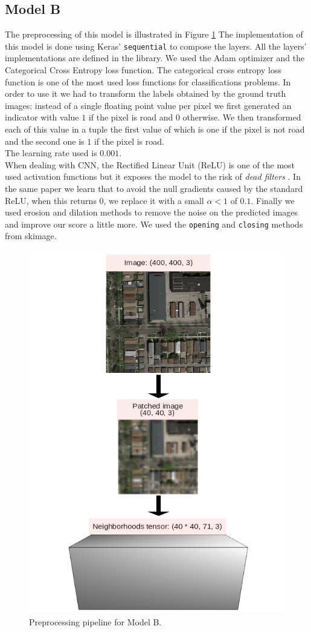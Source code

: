 \documentclass[10pt,conference,compsocconf]{IEEEtran}
\begin{document}
\subsection{Model B}
The preprocessing of this model is illustrated in Figure \ref{fig:cnn-preproc}
The implementation of this model is done using Keras' \texttt{sequential} to compose the layers. All the layers' implementations are defined in the library. We used the Adam optimizer and the Categorical Cross Entropy loss function.
The categorical cross entropy loss function is one of the most used loss functions for classifications problems. In order to use it we had to transform the labels obtained by the ground truth images: instead of a single floating point value per pixel we first generated an indicator with value $1$ if the pixel is road and $0$ otherwise.
We then transformed each of this value in a tuple the first value of which is one if the pixel is not road and the second one is $1$ if the pixel is road.\\
The learning rate used is $0.001$.\\
When dealing with CNN, the Rectified Linear Unit (ReLU) is one of the most used activation functions but it exposes the model to the risk of \textit{dead filters} \cite{leakyrelu}. In the same paper we learn that to avoid the null gradients caused by the standard ReLU, when this returns 0, we replace it with a small $\alpha < 1$ of $0.1$.
Finally we used erosion and dilation methods to remove the noise on the predicted images and improve our score a little more. We used the \texttt{opening} and \texttt{closing} methods from skimage.

\begin{figure}[t]
  \centering
  \includegraphics[height=0.7\columnwidth]{cnn-preprocessing-schema.png}
  \caption{Preprocessing pipeline for Model B.}
  \vspace{-3mm}
  \label{fig:cnn-preproc}
\end{figure}
\end{document}
